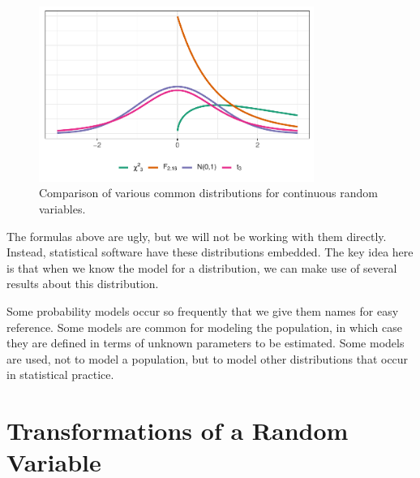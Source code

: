 \documentclass[
  letterpaper,
  DIV=11,
  numbers=noendperiod]{scrreprt}
\theoremstyle{definition}
\theoremstyle{definition}
\theoremstyle{plain}
\theoremstyle{remark}
\begin{document}
\begin{figure}

{\centering \includegraphics[width=0.8\textwidth,height=\textheight]{./images/fig-randomvariables-comparisons-1.pdf}

}

\caption{\label{fig-randomvariables-comparisons}Comparison of various
common distributions for continuous random variables.}

\end{figure}

The formulas above are ugly, but we will not be working with them
directly. Instead, statistical software have these distributions
embedded. The key idea here is that when we know the model for a
distribution, we can make use of several results about this
distribution.

\begin{tcolorbox}[enhanced jigsaw, title=\textcolor{quarto-callout-tip-color}{\faLightbulb}\hspace{0.5em}{Big Idea}, colbacktitle=quarto-callout-tip-color!10!white, titlerule=0mm, toptitle=1mm, breakable, bottomtitle=1mm, colframe=quarto-callout-tip-color-frame, opacitybacktitle=0.6, bottomrule=.15mm, arc=.35mm, toprule=.15mm, colback=white, rightrule=.15mm, coltitle=black, leftrule=.75mm, left=2mm, opacityback=0]

Some probability models occur so frequently that we give them names for
easy reference. Some models are common for modeling the population, in
which case they are defined in terms of unknown parameters to be
estimated. Some models are used, not to model a population, but to model
other distributions that occur in statistical practice.

\end{tcolorbox}

\hypertarget{transformations-of-a-random-variable}{%
\section{Transformations of a Random
Variable}\label{transformations-of-a-random-variable}}
\end{document}
